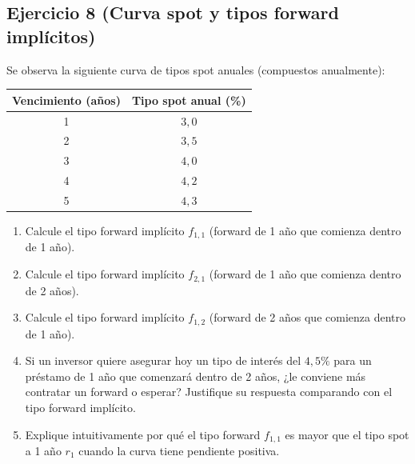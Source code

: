 \documentclass[12pt,a4paper]{article}
\newenvironment{ejercicio}[1]{\subsection*{Ejercicio #1}}{}
\begin{document}
\begin{ejercicio}{8 (Curva spot y tipos forward implícitos)}
Se observa la siguiente curva de tipos spot anuales (compuestos anualmente):
\begin{center}
\begin{tabular}{cc}
\toprule
Vencimiento (años) & Tipo spot anual (\%) \\
\midrule
1 & \(3{,}0\) \\
2 & \(3{,}5\) \\
3 & \(4{,}0\) \\
4 & \(4{,}2\) \\
5 & \(4{,}3\) \\
\bottomrule
\end{tabular}
\end{center}
\begin{enumerate}[label=\alph*)]
   \item Calcule el tipo forward implícito \(f_{1,1}\) (forward de 1 año que comienza dentro de 1 año).
   \item Calcule el tipo forward implícito \(f_{2,1}\) (forward de 1 año que comienza dentro de 2 años).
   \item Calcule el tipo forward implícito \(f_{1,2}\) (forward de 2 años que comienza dentro de 1 año).
   \item Si un inversor quiere asegurar hoy un tipo de interés del \(4{,}5\%\) para un préstamo de 1 año que comenzará dentro de 2 años, ¿le conviene más contratar un forward o esperar? Justifique su respuesta comparando con el tipo forward implícito.
   \item Explique intuitivamente por qué el tipo forward \(f_{1,1}\) es mayor que el tipo spot a 1 año \(r_1\) cuando la curva tiene pendiente positiva.
\end{enumerate}
\end{ejercicio}
\end{document}
